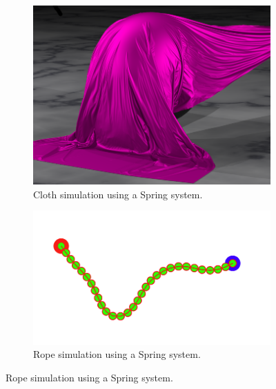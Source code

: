 \begin{figure}
	\begin{subfigure}[b]{0.4\textwidth}
		\includegraphics[width=\textwidth]{cloth1}
		\caption{Cloth simulation using a Spring system.}
		\label{fig:two}
	\end{subfigure}
	\begin{subfigure}[b]{0.4\textwidth}
		\includegraphics[width=\textwidth]{rope1}
		\caption{Rope simulation using a Spring system.}
		\label{fig:three}
	\end{subfigure}
\end{figure}
